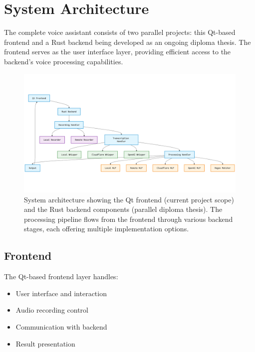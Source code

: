 \section{System Architecture}
The complete voice assistant consists of two parallel projects: this Qt-based frontend and a Rust backend being developed as an ongoing diploma thesis. The frontend serves as the user interface layer, providing efficient access to the backend's voice processing capabilities.

\begin{figure}[H]
    \centering
    \includegraphics[width=\textwidth]{assets/stackchart}
    \caption{System architecture showing the Qt frontend (current project scope) and the Rust backend components (parallel diploma thesis). The processing pipeline flows from the frontend through various backend stages, each offering multiple implementation options.}
    \label{fig:system-architecture}
\end{figure}

\subsection{Frontend}
The Qt-based frontend layer handles:
\begin{itemize}
    \item User interface and interaction
    \item Audio recording control
    \item Communication with backend
    \item Result presentation
\end{itemize}


